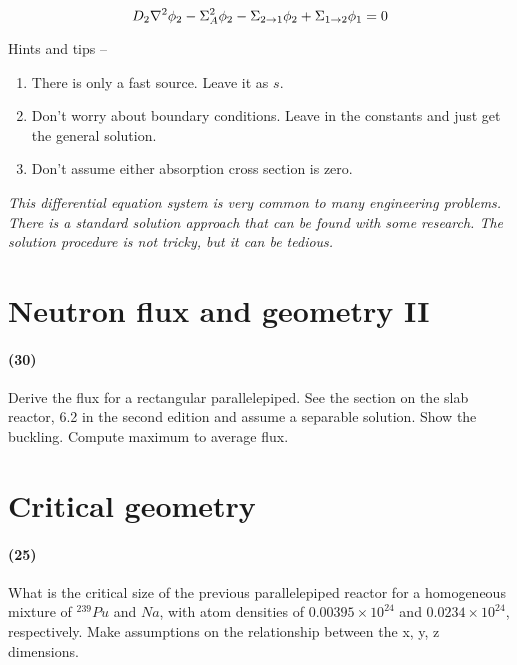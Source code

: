 \documentclass[11pt,a4paper]{article}
\begin{document}
\begin{equation} \label{eq-thermal-flux}
    \large D_2\nabla^2{\phi_2}-\Sigma_A^2\phi_2-\Sigma_{2 \rightarrow 1}\phi_2+\Sigma_{1 \rightarrow 2}\phi_1=0
\end{equation}

\noindent Hints and tips --
\begin{enumerate}[leftmargin=*,topsep=0pt,label=(\alph*)]
    \item There is only a fast source. Leave it as $s$.
    \item Don't worry about boundary conditions. Leave in the constants and just get the general solution.
    \item Don't assume either absorption cross section is zero.
\end{enumerate}

\vspace{\baselineskip}

\noindent\textit{This differential equation system is very common to many engineering problems. There is a standard solution approach that can be found with some research. The solution procedure is not tricky, but it can be tedious.}





\newpage

\section{Neutron flux and geometry II}
\paragraph*{(30)}
Derive the flux for a rectangular parallelepiped. See the section on the slab reactor, 6.2 in the second edition and assume a separable solution. Show the buckling. Compute maximum to average flux.





\newpage

\section{Critical geometry}
\paragraph*{(25)}
What is the critical size of the previous parallelepiped reactor for a homogeneous mixture of $^{239}Pu$ and $Na$, with atom densities of $0.00395 \times 10^{24}$ and $0.0234 \times 10^{24}$, respectively. Make assumptions on the relationship between the x, y, z dimensions.
\end{document}
